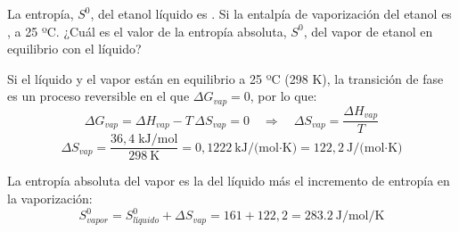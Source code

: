 \begin{exercise}
    La entropía, \(S^0\), del etanol líquido es . Si la entalpía de vaporización del etanol es , a 25 ºC. ¿Cuál es el valor de la entropía absoluta, \(S^0\), del vapor de etanol en equilibrio con el líquido?


    \begin{solu}


        Si el líquido y el vapor están en equilibrio a 25 ºC (298 K), la transición de fase es un proceso reversible en el que \(\Delta G_{vap} = 0\), por lo que:
        \[
            \Delta G_{vap} = \Delta H_{vap} - T \, \Delta S_{vap} = 0 \quad \Rightarrow \quad \Delta S_{vap} = \frac{\Delta H_{vap}}{T}
        \]
        \[
            \Delta S_{vap} = \frac{36{,}4 \; \text{kJ/mol}}{298\ \text{K}} = 0{,}1222\ \text{kJ/(mol·K)} = 122{,}2\ \text{J/(mol·K)}
        \]

        La entropía absoluta del vapor es la del líquido más el incremento de entropía en la vaporización:
        \[
            S^0_{vapor} = S^0_{líquido} + \Delta S_{vap} = 161 + 122{,}2 = \SI{283,2}{\joule\per\mole\per\kelvin}
        \]
    \end{solu}
\end{exercise}
